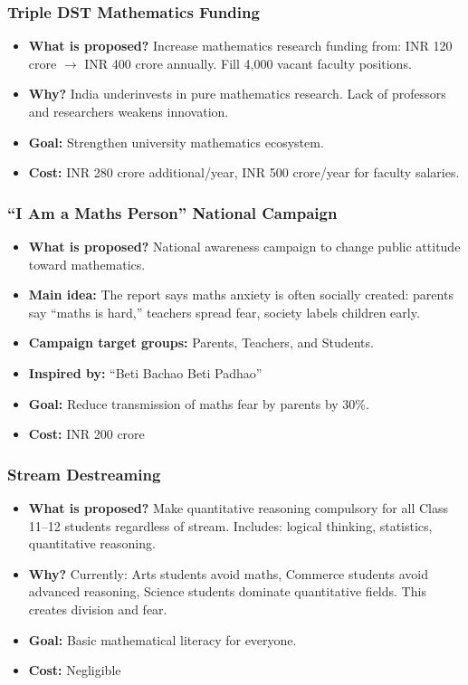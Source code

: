 \documentclass[12pt,a4paper]{article}
\begin{document}
\subsubsection{Triple DST Mathematics Funding}
\begin{itemize}[leftmargin=*]
    \item \textbf{What is proposed?} Increase mathematics research funding from: INR 120 crore $\rightarrow$ INR 400 crore annually. Fill 4,000 vacant faculty positions.
    \item \textbf{Why?} India underinvests in pure mathematics research. Lack of professors and researchers weakens innovation.
    \item \textbf{Goal:} Strengthen university mathematics ecosystem.
    \item \textbf{Cost:} INR 280 crore additional/year, INR 500 crore/year for faculty salaries.
\end{itemize}

\subsubsection{“I Am a Maths Person” National Campaign}
\begin{itemize}[leftmargin=*]
    \item \textbf{What is proposed?} National awareness campaign to change public attitude toward mathematics.
    \item \textbf{Main idea:} The report says maths anxiety is often socially created: parents say “maths is hard,” teachers spread fear, society labels children early.
    \item \textbf{Campaign target groups:} Parents, Teachers, and Students.
    \item \textbf{Inspired by:} “Beti Bachao Beti Padhao”
    \item \textbf{Goal:} Reduce transmission of maths fear by parents by 30\%.
    \item \textbf{Cost:} INR 200 crore
\end{itemize}

\subsubsection{Stream Destreaming}
\begin{itemize}[leftmargin=*]
    \item \textbf{What is proposed?} Make quantitative reasoning compulsory for all Class 11–12 students regardless of stream. Includes: logical thinking, statistics, quantitative reasoning.
    \item \textbf{Why?} Currently: Arts students avoid maths, Commerce students avoid advanced reasoning, Science students dominate quantitative fields. This creates division and fear.
    \item \textbf{Goal:} Basic mathematical literacy for everyone.
    \item \textbf{Cost:} Negligible
\end{itemize}
\end{document}
